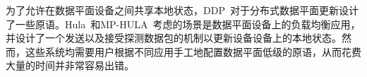 为了允许在数据平面设备之间共享本地状态，DDP~\cite{ddp}对于分布式数据平面更新设计了一些原语。Hula~\cite{katta2016hula}和MP-HULA~\cite{benet2018mp}考虑的场景是数据平面设备上的负载均衡应用，并设计了一个发送以及接受探测数据包的机制以更新设备设备上的本地状态。然而，这些系统均需要用户根据不同应用手工地配置数据平面低级的原语，从而花费大量的时间并非常容易出错。


